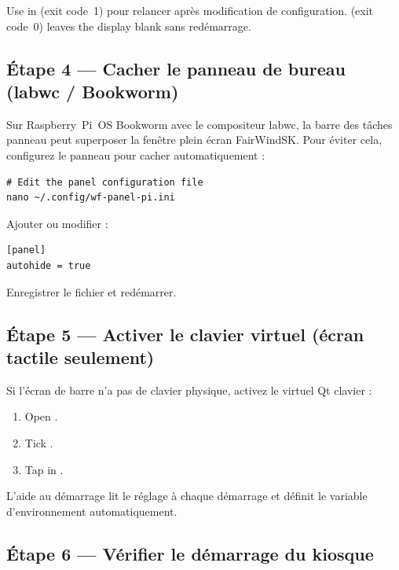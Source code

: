 \begin{warningbox}
Use  in  (exit code~1)
pour relancer après modification de configuration.
 (exit code~0) leaves the display blank
sans redémarrage.
\end{warningbox}

\subsection{Étape 4 --- Cacher le panneau de bureau (labwc / Bookworm)}

Sur Raspberry~Pi~OS Bookworm avec le compositeur labwc, la barre des tâches
panneau peut superposer la fenêtre plein écran FairWindSK.
Pour éviter cela, configurez le panneau pour cacher automatiquement :

\begin{lstlisting}
# Edit the panel configuration file
nano ~/.config/wf-panel-pi.ini
\end{lstlisting}

Ajouter ou modifier :

\begin{lstlisting}
[panel]
autohide = true
\end{lstlisting}

Enregistrer le fichier et redémarrer.

\subsection{Étape 5 --- Activer le clavier virtuel (écran tactile seulement)}

Si l'écran de barre n'a pas de clavier physique, activez le virtuel Qt
clavier :

\begin{enumerate}
  \item Open .
  \item Tick .
  \item Tap  in .
\end{enumerate}

L'aide au démarrage lit le réglage à chaque démarrage et définit le
variable d'environnement automatiquement.

\subsection{Étape 6 --- Vérifier le démarrage du kiosque}

